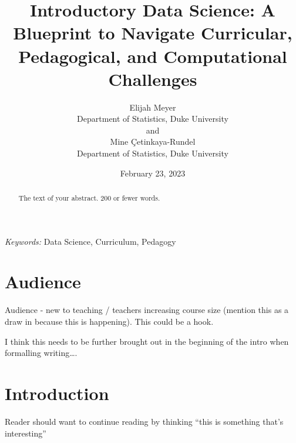 \documentclass[
  12pt]{article}
\begin{document}
\def\spacingset#1{\renewcommand{\baselinestretch}%
{#1}\small\normalsize} \spacingset{1}



\date{February 23, 2023}
\title{\bf Introductory Data Science: A Blueprint to Navigate
Curricular, Pedagogical, and Computational Challenges}
\author{
Elijah Meyer\\
Department of Statistics, Duke University\\
and\\Mine Çetinkaya-Rundel\\
Department of Statistics, Duke University\\
}
\maketitle

\bigskip
\bigskip
\begin{abstract}
The text of your abstract. 200 or fewer words.
\end{abstract}

\noindent%
{\it Keywords:} Data Science, Curriculum, Pedagogy
\vfill

\newpage
\spacingset{1.9} %
\ifdefined\Shaded\renewenvironment{Shaded}{\begin{tcolorbox}[interior hidden, frame hidden, borderline west={3pt}{0pt}{shadecolor}, enhanced, sharp corners, breakable, boxrule=0pt]}{\end{tcolorbox}}\fi

\hypertarget{audience}{%
\section{Audience}\label{audience}}

Audience - new to teaching / teachers increasing course size (mention
this as a draw in because this is happening). This could be a hook.

I think this needs to be further brought out in the beginning of the
intro when formalling writing\ldots.

\hypertarget{sec-intro}{%
\section{Introduction}\label{sec-intro}}

Reader should want to continue reading by thinking ``this is something
that's interesting''
\end{document}
